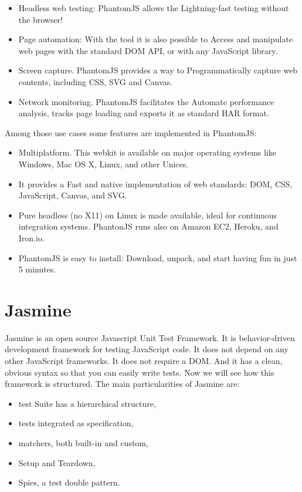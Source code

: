 \documentclass[11pt]{article}
\begin{document}
\begin{itemize}
\item Headless web testing: PhantomJS allows the Lightning-fast testing without the browser!
\item Page automation: With the tool it is also possible to Access and manipulate web pages with the standard DOM API, or with any JavaScript library.
\item Screen capture. PhantomJS provides a way to Programmatically capture web contents, including CSS, SVG and Canvas.
\item Network monitoring. PhantomJS facilitates the Automate performance analysis, tracks page loading and exports it as standard HAR format.
\end{itemize}

Among those use cases some features are implemented in PhantomJS:

\begin{itemize}
\item Multiplatform. This webkit is available on major operating systems like Windows, Mac OS X, Linux, and other Unices.
\item It provides a Fast and native implementation of web standards: DOM, CSS, JavaScript, Canvas, and SVG.
\item Pure headless (no X11) on Linux is made available, ideal for continuous integration systems. PhantonJS runs also on Amazon EC2, Heroku, and Iron.io.
\item PhantomJS is easy to install: Download, unpack, and start having fun in just 5 minutes.
\end{itemize}

\section{Jasmine}

Jasmine is an open source Javascript Unit Test Framework. It is behavior-driven development framework for testing JavaScript code. It does not depend on any other JavaScript frameworks. It does not require a DOM. And it has a clean, obvious syntax so that you can easily write tests. Now we will see how this framework is structured. The main particularities of Jasmine are:

\begin{itemize}
\item test Suite has a hierarchical structure,
\item tests integrated as specification,
\item matchers, both built-in and custom,
\item Setup and Teardown,
\item Spies, a test double pattern.
\end{itemize}
\end{document}
